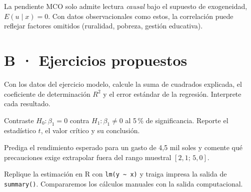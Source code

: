 \documentclass{academic-exam}
\begin{document}
\begin{observacion}
La pendiente MCO solo admite lectura \emph{causal} bajo el supuesto de
exogeneidad, $E(u\mid x)=0$. Con datos observacionales como estos, la
correlación puede reflejar factores omitidos (ruralidad, pobreza,
gestión educativa).
\end{observacion}

\section*{\color{colorprimario}B · Ejercicios propuestos}

\begin{ejercicio}
Con los datos del ejercicio modelo, calcule la suma de cuadrados
explicada, el coeficiente de determinación $R^{2}$ y el error estándar de
la regresión. Interprete cada resultado.
\end{ejercicio}

\begin{ejercicio}[][Inferencia]
Contraste $H_0\colon \beta_1 = 0$ contra $H_1\colon \beta_1 \neq 0$ al
5\,\% de significancia. Reporte el estadístico $t$, el valor crítico y su
conclusión.
\end{ejercicio}

\begin{ejercicio}[][Predicción]
Prediga el rendimiento esperado para un gasto de 4,5 mil soles y comente
qué precauciones exige extrapolar fuera del rango muestral
$[2{,}1;\,5{,}0]$.
\end{ejercicio}

\begin{observacion}
Replique la estimación en R con \texttt{lm(y \textasciitilde{} x)} y
traiga impresa la salida de \texttt{summary()}. Compararemos los cálculos
manuales con la salida computacional.
\end{observacion}

\findelexamen
\end{document}
